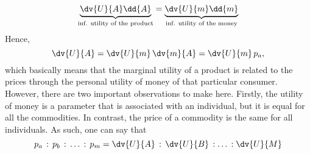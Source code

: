 \begin{itemize}
    $$ \underbrace{\dv{U}{A}\dd{A}}_{\text{inf. utility of the product}} = \underbrace{\dv{U}{m}\dd{m}}_{\text{inf. utility of the money}} $$
    Hence,
    $$ \dv{U}{A} = \dv{U}{m} \, \dv{m}{A} =  \dv{U}{m}\,p_a,$$
    which basically means that the marginal utility of a product is related to the prices through the personal utility of money of that particular consumer. However, there are two important observations to make here. Firstly, the utility of money is a parameter that is associated with an individual, but it is equal for all the commodities. In contrast, the price of a commodity is the same for all individuals. As such, one can say that 
    $$ p_a \, : \, p_b \, : \, \ldots\,: \,p_m  = \dv{U}{A} \, : \, \dv{U}{B} \, : \ldots \, : \dv{U}{M}$$
    
    
\end{itemize}